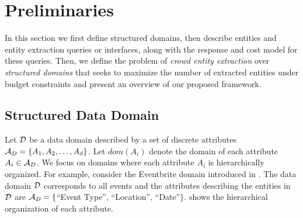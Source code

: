 
\section{Preliminaries}
\label{sec:prelims}
In this section we first define structured domains, then describe entities and entity extraction queries or interfaces, along with the response and cost model for these queries. Then, we define the problem of {\em crowd entity extraction} over {\em structured domains} that seeks to maximize the number of extracted entities under budget constraints and present an overview of our proposed framework.


\subsection{Structured Data Domain}
\label{sec:data-domain}

Let $\mathcal{D}$ be a data domain described by a set of discrete attributes $\mathcal{A}_D = \{A_1, A_2, \dots, A_d\}$. Let $dom(A_i)$ denote the domain of each attribute $A_i  \in \mathcal{A}_D$. We focus on domains where each attribute $A_i$ is hierarchically organized. \iftr For example, consider the Eventbrite domain introduced in . The data domain $\mathcal{D}$ corresponds to all events and the attributes describing the entities in $\mathcal{D}$ are $\mathcal{A}_D = \{$``Event Type'', ``Location'', ``Date''$\}$.  shows the hierarchical organization of each attribute.

